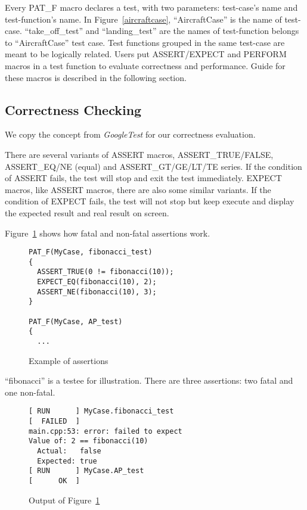 \documentclass[final]{ols}
\begin{document}
Every PAT\_F macro declares a test, with two parameters: test-case's name and test-function's name.
In Figure~\ref{aircraftcase}, ``AircraftCase'' is the name of test-case.
``take\_off\_test'' and ``landing\_test'' are the names of test-function belongs to ``AircraftCase'' test case.
Test functions grouped in the same test-case are meant to be logically related.
Users put ASSERT/EXPECT and PERFORM macros in a test function to evaluate correctness and performance.
Guide for these macros is described in the following section.

\subsection{Correctness Checking}
We copy the concept from \textit{GoogleTest} for our correctness evaluation.

There are several variants of ASSERT macros, ASSERT\_TRUE/FALSE, ASSERT\_EQ/NE (equal) and ASSERT\_GT/GE/LT/TE series.
If the condition of ASSERT fails, the test will stop and exit the test immediately.
EXPECT macros, like ASSERT macros, there are also some similar variants.
If the condition of EXPECT fails, the test will not stop but keep execute and display the expected result and real result on screen.

Figure~\ref{assert_example} shows how fatal and non-fatal assertions work.

\begin{figure}[h]
\lstset{language=C++}
\begin{lstlisting}[frame=single]
PAT_F(MyCase, fibonacci_test)
{
  ASSERT_TRUE(0 != fibonacci(10));
  EXPECT_EQ(fibonacci(10), 2);
  ASSERT_NE(fibonacci(10), 3);
}

PAT_F(MyCase, AP_test)
{
  ...
\end{lstlisting}
\caption{Example of assertions}
\label{assert_example}
\end{figure}

``fibonacci'' is a testee for illustration.
There are three assertions: two fatal and one non-fatal.

\begin{figure}[h]
\lstset{language=sh}
\begin{lstlisting}[frame=single]
[ RUN      ] MyCase.fibonacci_test
[  FAILED  ]
main.cpp:53: error: failed to expect
Value of: 2 == fibonacci(10)
  Actual:   false
  Expected: true
[ RUN      ] MyCase.AP_test
[      OK  ]
\end{lstlisting}
\caption{Output of Figure~\ref{assert_example}}
\label{assert_example_output}
\end{figure}
\end{document}

